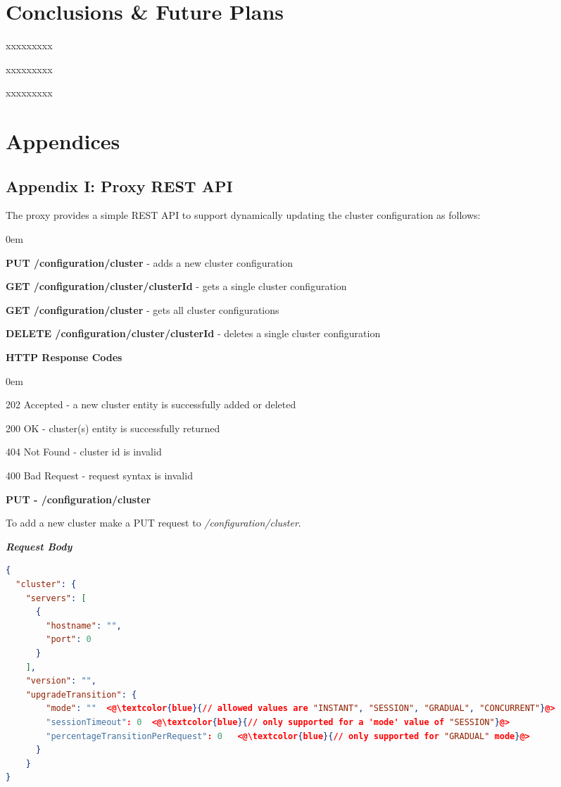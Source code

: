 \documentclass[a4paper,11pt,twoside]{article}
\begin{document}
\section{Conclusions \& Future Plans}
xxxxxxxxx\bigskip

xxxxxxxxx\bigskip

xxxxxxxxx\bigskip


\clearpage
\section{Appendices}

\subsection{Appendix I: Proxy REST API}\label{Appendix I}
The proxy provides a simple REST API to support dynamically updating the cluster configuration as follows:

\begin{list}{-}{}
  \itemsep0em
  \item \textbf{PUT /configuration/cluster} - adds a new cluster configuration  
 \item\textbf{GET /configuration/cluster/{clusterId}} - gets a single cluster configuration
 \item\textbf{GET /configuration/cluster} - gets all cluster configurations
 \item\textbf{DELETE /configuration/cluster/{clusterId}} - deletes a single cluster configuration
\end{list}

\noindent
\textbf{HTTP Response Codes}
\begin{list}{-}{}
  \itemsep0em
\item 202 Accepted - a new cluster entity is successfully added or deleted 
\item 200 OK - cluster(s) entity is successfully returned   
\item 404 Not Found - cluster id is invalid
\item 400 Bad Request - request syntax is  invalid
\end{list}

\noindent
\textbf{PUT - /configuration/cluster}

\noindent
To add a new cluster make a PUT request to \textit{/configuration/cluster}.\bigskip

\noindent
\textit{\textbf{Request Body}}
 
\begin{lstlisting}[language=json]
{
  "cluster": {
    "servers": [
      {
        "hostname": "",
        "port": 0
      }
    ],
    "version": "",
    "upgradeTransition": {
        "mode": ""  <@\textcolor{blue}{// allowed values are "INSTANT", "SESSION", "GRADUAL", "CONCURRENT"}@>
        "sessionTimeout": 0  <@\textcolor{blue}{// only supported for a 'mode' value of "SESSION"}@> 
        "percentageTransitionPerRequest": 0   <@\textcolor{blue}{// only supported for "GRADUAL" mode}@>
      }
    }
}
\end{lstlisting}
\end{document}
